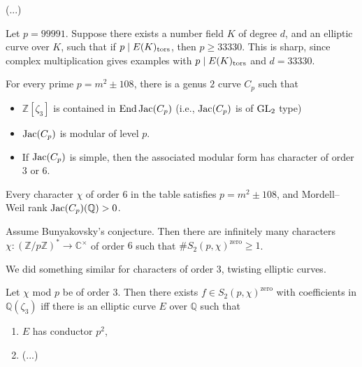 \documentclass[reqno]{amsart} 
\begin{document}
(...)

\begin{example}
  Let $p =99991$.  Suppose there exists a number field $K$ of degree $d$, and an elliptic curve over $K$, such that if $p \mid E(K)_{\operatorname{tors}}$, then $p \geq 33330$.  This is sharp, since complex multiplication gives examples with $p \mid E(K)_{\operatorname{tors}}$ and $d = 33330$.
\end{example}

\begin{proposition}[D.,\ Stoll]
  For every prime $p = m^2 \pm 108$, there is a genus $2$ curve $C_p$ such that
  \begin{itemize}
  \item $\mathbb{Z}[\zeta_3]$ is contained in $\operatorname{End} \operatorname{Jac}(C_p)$ (i.e., $\operatorname{Jac}(C_p)$ is of $\operatorname{GL}_2$ type)
  \item $\operatorname{Jac}(C_p)$ is modular of level $p$.
  \item If $\operatorname{Jac}(C_p)$ is simple, then the associated modular form has character of order $3$ or $6$.
  \end{itemize}
\end{proposition}

\begin{proposition}
  Every character $\chi$ of order $6$ in the table satisfies $p = m^2 \pm 108$, and Mordell--Weil rank $\operatorname{Jac}(C_p)(\mathbb{Q}) > 0$.
\end{proposition}

\begin{lemma}[D.,\ Stoll]
  Assume Bunyakovsky's conjecture.  Then there are infinitely many characters $\chi :(\mathbb{Z} / p \mathbb{Z})^\ast \rightarrow \mathbb{C}^\times$ of order $6$ such that $\# S_2(p, \chi)^{\mathrm{zero}} \geq 1$.
\end{lemma}

We did something similar for characters of order $3$, twisting elliptic curves.
\begin{lemma}[D.,\ Stoll]
  Let $\chi$ mod $p$ be of order $3$.  Then there exists $f \in S_2(p, \chi)^{\mathrm{zero}}$ with coefficients in $\mathbb{Q}(\zeta_3)$ iff there is an elliptic curve $E$ over $\mathbb{Q}$ such that
  \begin{enumerate}
  \item $E$ has conductor $p^2$,
  \item (...)
  \end{enumerate}
\end{lemma}
\end{document}
